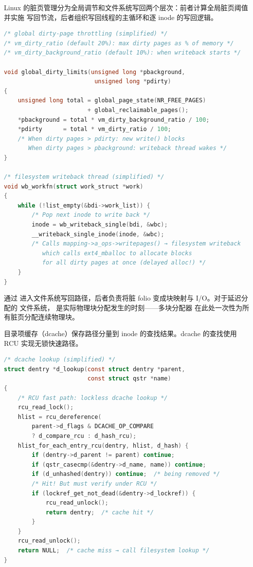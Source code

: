 \begin{filesystemlayout}
Linux 的脏页管理分为全局调节和文件系统写回两个层次：前者计算全局脏页阈值并实施
写回节流，后者组织写回线程的主循环和逐 inode 的写回逻辑。

\begin{lstlisting}[language=C]
/* global dirty-page throttling (simplified) */
/* vm_dirty_ratio (default 20%): max dirty pages as % of memory */
/* vm_dirty_background_ratio (default 10%): when writeback starts */

void global_dirty_limits(unsigned long *pbackground,
                          unsigned long *pdirty)
{
    unsigned long total = global_page_state(NR_FREE_PAGES)
                        + global_reclaimable_pages();
    *pbackground = total * vm_dirty_background_ratio / 100;
    *pdirty      = total * vm_dirty_ratio / 100;
    /* When dirty pages > pdirty: new write() blocks
       When dirty pages > pbackground: writeback thread wakes */
}

/* filesystem writeback thread (simplified) */
void wb_workfn(struct work_struct *work)
{
    while (!list_empty(&bdi->work_list)) {
        /* Pop next inode to write back */
        inode = wb_writeback_single(bdi, &wbc);
        __writeback_single_inode(inode, &wbc);
        /* Calls mapping->a_ops->writepages() → filesystem writeback
           which calls ext4_mballoc to allocate blocks
           for all dirty pages at once (delayed alloc!) */
    }
}
\end{lstlisting}

 通过 
进入文件系统写回路径，后者负责将脏 folio 变成块映射与 I/O。对于延迟分配的
文件系统， 是实际物理块分配发生的时刻——多块分配器
 在此处一次性为所有脏页分配连续物理块。


目录项缓存（dcache）保存路径分量到 inode 的查找结果。dcache 的查找使用 RCU
实现无锁快速路径。

\begin{lstlisting}[language=C]
/* dcache lookup (simplified) */
struct dentry *d_lookup(const struct dentry *parent,
                        const struct qstr *name)
{
    /* RCU fast path: lockless dcache lookup */
    rcu_read_lock();
    hlist = rcu_dereference(
        parent->d_flags & DCACHE_OP_COMPARE
        ? d_compare_rcu : d_hash_rcu);
    hlist_for_each_entry_rcu(dentry, hlist, d_hash) {
        if (dentry->d_parent != parent) continue;
        if (qstr_casecmp(&dentry->d_name, name)) continue;
        if (d_unhashed(dentry)) continue;  /* being removed */
        /* Hit! But must verify under RCU */
        if (lockref_get_not_dead(&dentry->d_lockref)) {
            rcu_read_unlock();
            return dentry;  /* cache hit */
        }
    }
    rcu_read_unlock();
    return NULL;  /* cache miss → call filesystem lookup */
}
\end{lstlisting}


\end{filesystemlayout}
